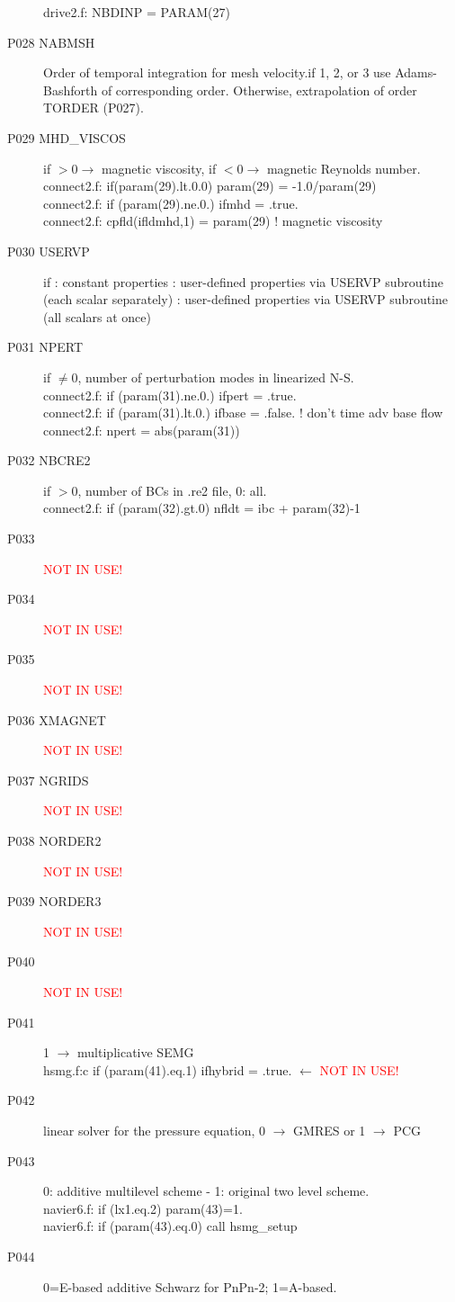 \begin{description}
drive2.f:      NBDINP = PARAM(27)
\item [P028  NABMSH] Order of temporal integration for mesh velocity.if 1, 2, or 3 use Adams-Bashforth of corresponding order. Otherwise, extrapolation of order TORDER (P027).\\
\item [P029  MHD\_VISCOS] if \(>0 \rightarrow\) magnetic viscosity, if \(<0 \rightarrow\) magnetic Reynolds number.\\
connect2.f:      if(param(29).lt.0.0) param(29) = -1.0/param(29)\\
connect2.f:      if (param(29).ne.0.) ifmhd  = .true.\\
connect2.f:         cpfld(ifldmhd,1) = param(29)  ! magnetic viscosity
\item [P030  USERVP] if
	: constant properties
	: user-defined properties via USERVP subroutine (each scalar separately)
	: user-defined properties via USERVP subroutine (all scalars at once)
\item [P031  NPERT]  if \(\ne 0\), number of perturbation modes in linearized N-S.\\
connect2.f:      if (param(31).ne.0.) ifpert = .true.\\
connect2.f:      if (param(31).lt.0.) ifbase = .false.   ! don't time adv base flow\\
connect2.f:      npert = abs(param(31)) 
\item [P032  NBCRE2] if \(>0\), number of BCs in .re2 file, 0: all.\\
connect2.f:      if (param(32).gt.0) nfldt = ibc + param(32)-1
\item [P033  ] {\textcolor{red}{ NOT IN USE!}}
\item [P034  ] {\textcolor{red}{ NOT IN USE!}}
\item [P035  ] {\textcolor{red}{ NOT IN USE!}}
\item [P036  XMAGNET] {\textcolor{red}{ NOT IN USE!}}
\item [P037  NGRIDS] {\textcolor{red}{ NOT IN USE!}}
\item [P038  NORDER2] {\textcolor{red}{ NOT IN USE!}}
\item [P039  NORDER3] {\textcolor{red}{ NOT IN USE!}}
\item [P040  ] {\textcolor{red}{ NOT IN USE!}}
\item [P041  ] 1 \(\rightarrow\) multiplicative SEMG\\
hsmg.f:c     if (param(41).eq.1) ifhybrid = .true. \(\leftarrow\) {\textcolor{red}{ NOT IN USE!}}
\item [P042  ] linear solver for the pressure equation, 0 \(\rightarrow\) GMRES or 1 \(\rightarrow\) PCG
\item [P043  ] 0: additive multilevel scheme - 1: original two level scheme.\\
navier6.f:      if (lx1.eq.2) param(43)=1.\\   
navier6.f:            if (param(43).eq.0) call hsmg\_setup         
\item [P044  ] 0=E-based additive Schwarz for PnPn-2; 1=A-based.


\end{description}
